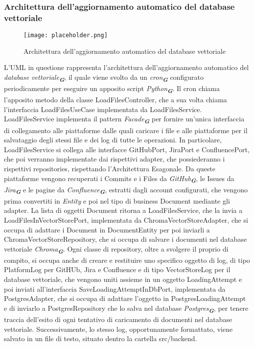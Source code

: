 \subsubsection{Architettura dell'aggiornamento automatico del database vettoriale}
\label{sec:architettura_aggiornamento_database_vettoriale}

\begin{figure}[h]
    \centering
    \texttt{[image: placeholder.png]}
    \caption{Architettura dell'aggiornamento automatico del database vettoriale}
\end{figure}

L'UML in questione rappresenta l'architettura dell'aggiornamento automatico del \emph{database vettoriale}\textsubscript{\textbf{\textit{G}}}, il quale viene svolto da un \emph{cron}\textsubscript{\textbf{\textit{G}}} configurato periodicamente per eseguire un apposito script \emph{Python}\textsubscript{\textbf{\textit{G}}}. Il cron chiama l'apposito metodo della classe LoadFilesController, che a sua volta chiama l'interfaccia LoadFilesUseCase implementata da LoadFilesService.
LoadFilesService implementa il pattern \emph{Facade}\textsubscript{\textbf{\textit{G}}} per fornire un'unica interfaccia di collegamento alle piattaforme dalle quali caricare i file e alle piattaforme per il salvataggio degli stessi file e dei log di tutte le operazioni. In particolare, LoadFilesService si collega alle interfacce GitHubPort, JiraPort e ConfluencePort, che poi verranno implementate dai rispettivi adapter, che possiederanno i rispettivi repositories, rispettando l'Architettura Esagonale. Da queste piattaforme vengono recuperati i Commits e i Files da \emph{GitHub}\textsubscript{\textbf{\textit{G}}}, le Issues da \emph{Jira}\textsubscript{\textbf{\textit{G}}} e le pagine da \emph{Confluence}\textsubscript{\textbf{\textit{G}}}, estratti dagli account configurati, che vengono prima convertiti in \emph{Entity} e poi nel tipo di business Document mediante gli adapter. La lista di oggetti Document ritorna a LoadFilesService, che la invia a LoadFilesInVectorStorePort, implementata da ChromaVectorStoreAdapter, che si occupa di adattare i Document in DocumentEntity per poi inviarli a ChromaVectorStoreRepository, che si occupa di salvare i documenti nel database vettoriale \emph{Chroma}\textsubscript{\textbf{\textit{G}}}.
Ogni classe di repository, oltre a svolgere il proprio di compito, si occupa anche di creare e restituire uno specifico oggetto di log, di tipo PlatformLog per GitHUb, Jira e Confluence e di tipo VectorStoreLog per il database vettoriale, che vengono uniti assieme in un oggetto LoadingAttempt e poi inviati all'interfaccia SaveLoadingAttemptInDbPort, implementata da PostgresAdapter, che si occupa di adattare l'oggetto in PostgresLoadingAttempt e di inviarlo a PostgresRepository che lo salva nel database \emph{Postgres}\textsubscript{\textbf{\textit{G}}}, per tenere traccia dell'esito di ogni tentativo di caricamento di documenti nel database vettoriale. Successivamente, lo stesso log, opportunamente formattato, viene salvato in un file di testo, situato dentro la cartella src/backend.

